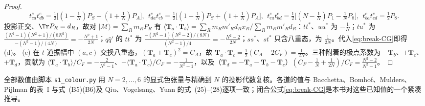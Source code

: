 \begin{proof}
\[
t^e_{ca}t^e_{db}=\tfrac12\big[(1-\tfrac1N)P_S-(1+\tfrac1N)P_A\big],\ \
t^e_{da}t^e_{cb}=\tfrac12\big[(1-\tfrac1N)P_S+(1+\tfrac1N)P_A\big],\ \
t^e_{ca}t^e_{bd}=\tfrac12\big[(N-\tfrac1N)P_1-\tfrac1NP_8\big],\ \
t^e_{ba}t^e_{cd}=\tfrac12P_8 .
\]
投影正交、$\Tr P_R=d_R$，故对 $|\mathcal M\rangle=\sum_Rm_RP_R$ 有 $\langle\mathbf T_a\cdot\mathbf T_b\rangle=\sum_Rm_Rm'_Rd_Rx_R/\sum_Rm_Rm'_Rd_R$：$tt^*$、$uu^*$ 为 $-\frac1N$；$tu^*$ 为 $\frac{(N^2-1)(N^2+1)/(8N^2)}{-(N^2-1)/(4N)}=-\frac{N^2+1}{2N}$；$q\bar q'$ 的 $tt^*$ 为 $\frac{-(N^2-1)(N^2-2)/(8N)}{(N^2-1)/4}=-\frac{N^2-2}{2N}$；$ss^*$、$st^*$ 只含八重态，为 $\frac1{2N}$。代入\cref{eq:break-CG}即得 (d)。
(e) 在 $t$ 道振幅中 $(a,c)$ 交换八重态，$(\mathbf T_a+\mathbf T_c)^2=C_A$，故 $\mathbf T_a\cdot\mathbf T_c=\frac12(C_A-2C_F)=\frac1{2N}$。三种附着的极点系数为 $-\mathbf T_b$、$+\mathbf T_c$、$+\mathbf T_d$，贡献为 $\langle\mathbf T_a\cdot\mathbf T_b\rangle/C_F=-\frac{2}{N^2-1}$、$-\langle\mathbf T_a\cdot\mathbf T_c\rangle/C_F=-\frac1{N^2-1}$，以及（$\mathbf T_d=-\mathbf T_a-\mathbf T_b-\mathbf T_c$）$(C_F-\frac1N+\frac1{2N})/C_F=\frac{N^2-2}{N^2-1}$。
\end{proof}

全部数值由脚本 \texttt{s1\_colour.py} 用 $N=2,\dots,6$ 的显式色张量与精确到 $N$ 的投影代数复核。各道的值与 Bacchetta、Bomhof、Mulders、Pijlman 的表~I 与式~(B5)(B6)\cite{BacchettaBomhofMuldersPijlman2005}及 Qiu、Vogelsang、Yuan 的式~(25)--(28)\cite{QiuVogelsangYuan2007}逐项一致；闭合公式\cref{eq:break-CG}是本书对这些已知值的一个紧凑推导。

